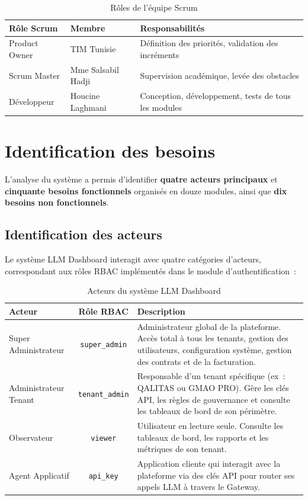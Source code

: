 \begin{table}[H]
\centering
\caption{Rôles de l'équipe Scrum}
\label{tab:scrum_roles}
\begin{tabularx}{\textwidth}{|l|l|X|}
\hline
\textbf{Rôle Scrum} & \textbf{Membre} & \textbf{Responsabilités} \\
\hline
Product Owner & TIM Tunisie & Définition des priorités, validation des incréments \\
\hline
Scrum Master & Mme Salsabil Hadji & Supervision académique, levée des obstacles \\
\hline
Développeur & Houcine Laghmani & Conception, développement, tests de tous les modules \\
\hline
\end{tabularx}
\end{table}


\section{Identification des besoins}
\label{sec:besoins}

L'analyse du système a permis d'identifier \textbf{quatre acteurs principaux} et \textbf{cinquante besoins fonctionnels} organisés en douze modules, ainsi que \textbf{dix besoins non fonctionnels}.

\subsection{Identification des acteurs}

Le système LLM Dashboard interagit avec quatre catégories d'acteurs, correspondant aux rôles RBAC implémentés dans le module d'authentification~:

\begin{table}[H]
\centering
\caption{Acteurs du système LLM Dashboard}
\label{tab:acteurs}
\begin{tabularx}{\textwidth}{|l|c|X|}
\hline
\textbf{Acteur} & \textbf{Rôle RBAC} & \textbf{Description} \\
\hline
Super Administrateur & \texttt{super\_admin} & Administrateur global de la plateforme. Accès total à tous les tenants, gestion des utilisateurs, configuration système, gestion des contrats et de la facturation. \\
\hline
Administrateur Tenant & \texttt{tenant\_admin} & Responsable d'un tenant spécifique (ex~: QALITAS ou GMAO PRO). Gère les clés API, les règles de gouvernance et consulte les tableaux de bord de son périmètre. \\
\hline
Observateur & \texttt{viewer} & Utilisateur en lecture seule. Consulte les tableaux de bord, les rapports et les métriques de son tenant. \\
\hline
Agent Applicatif & \texttt{api\_key} & Application cliente qui interagit avec la plateforme via des clés API pour router ses appels LLM à travers le Gateway. \\
\hline
\end{tabularx}
\end{table}

